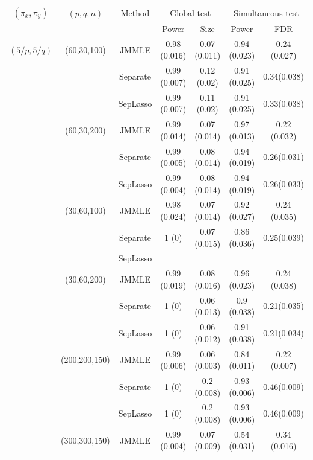 \begin{table}[t!]
\centering
    \begin{tabular}{ccccccc}
\hline
$(\pi_x, \pi_y)$  & $(p,q,n)$ & Method & \multicolumn{2}{c}{Global test} & \multicolumn{2}{c}{Simultaneous test} \\\cline{4-7}
& & & Power         & Size           & Power           & FDR \\\hline
    $(5/p, 5/q)$ & (60,30,100) & JMMLE    & 0.98 (0.016)  & 0.07 (0.011)   & 0.94 (0.023)   &  0.24 (0.027) \\
    ~ & ~         & Separate & 0.99 (0.007)  & 0.12 (0.02)    & 0.91 (0.025)   & 0.34(0.038)   \\
    ~ & ~         & SepLasso & 0.99 (0.007)  & 0.11 (0.02)    & 0.91 (0.025)  & 0.33(0.038)     \\\cline{2-7}
    ~ & (60,30,200) & JMMLE    & 0.99 (0.014)  & 0.07 (0.014)   & 0.97  (0.013)   & 0.22 (0.032)  \\
    ~ & ~         & Separate & 0.99 (0.005)  & 0.08 (0.014)   & 0.94 (0.019)   & 0.26(0.031)   \\
    ~ & ~         & SepLasso & 0.99 (0.004)  & 0.08 (0.014)   & 0.94 (0.019)  & 0.26(0.033)     \\\cline{2-7}
    ~ & (30,60,100) & JMMLE    & 0.98 (0.024)  &  0.07 (0.014)  & 0.92  (0.027)   & 0.24 (0.035)  \\
    ~ & ~         & Separate &  1 (0)         & 0.07 (0.015)    & 0.86 (0.036)   & 0.25(0.039)   \\
    ~ & ~         & SepLasso & ~              & ~               & ~               & ~              \\\cline{2-7}
    ~ & (30,60,200) & JMMLE    & 0.99 (0.019)  &  0.08 (0.016)  & 0.96 (0.023)   & 0.24 (0.038)  \\
    ~ & ~         & Separate & 1 (0)          & 0.06 (0.013)   & 0.9 (0.038)   & 0.21(0.035)   \\
    ~ & ~         & SepLasso & 1 (0)          & 0.06 (0.012)   & 0.91 (0.038) & 0.21(0.034)      \\\cline{2-7}
    ~ & (200,200,150) & JMMLE    & 0.99 (0.006)  & 0.06 (0.003)   & 0.84 (0.011)   & 0.22 (0.007)  \\
    ~ & ~         & Separate & 1 (0)          &  0.2 (0.008)  &  0.93 (0.006)  & 0.46(0.009)   \\
    ~ & ~         & SepLasso & 1 (0)          &  0.2 (0.008)  &  0.93 (0.006) & 0.46(0.009)   \\\cline{2-7}
    ~ & (300,300,150) & JMMLE    & 0.99 (0.004)  &  0.07 (0.009)  & 0.54  (0.031)   & 0.34 (0.016)  \\

\end{tabular}
\end{table}
